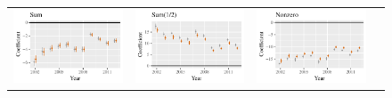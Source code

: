 \documentclass{article}
\begin{document}
\begin{figure} 
\centering
\renewcommand*{\arraystretch}{0}
\begin{tabular}{*{4}{@{}c}@{}}
\includegraphics[scale=.6]{draft_figures/rl_plots/Sum.pdf}    & 
\includegraphics[scale=.6]{draft_figures/rl_plots/Sum_5.pdf}   & 
\includegraphics[scale=.6]{draft_figures/rl_plots/Nonzero.pdf}  &

\end{tabular}
\end{figure}
\end{document}
